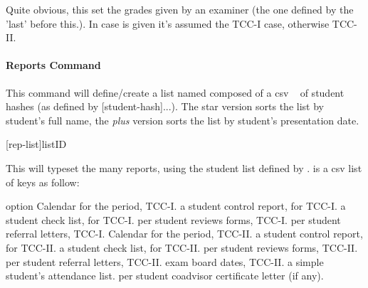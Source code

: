 \documentclass[article,nogeometry,english,tocdepth=3,secdepth=3]{ufrgscca} %
\begin{document}


\begin{codedescribe}[code,update=2023/11/18]{\examinergrades}
	\begin{codesyntax}%
	\end{codesyntax}
Quite obvious, this set the grades given by an examiner (the one defined by the 'last' \tsmacro{\examiner}{} before this.). In case  is given it's assumed the TCC-I case, otherwise TCC-II.
\end{codedescribe}


\paragraph{Reports Command}




\begin{codedescribe}[code,update=2023/11/29]{\setstudentlist}
	\begin{codesyntax}%
		\tsmacro{\setstudentlist}{listID,list}
		\tsmacro{\setstudentlist*}{listID,list}
	\end{codesyntax}
This command will define/create a list named  composed of a csv ~ of student hashes (as defined by \tsmacro{\student}[student-hash]{...}). The star version sorts the list by student's full name, the \emph{plus} version sorts the list by student's presentation date.
\end{codedescribe}

\begin{codedescribe}{\tcreports}
	\begin{codesyntax}%
		\tsmacro{\tcreports}[rep-list]{listID}
	\end{codesyntax}
	This will typeset the many reports, using the student list defined by .
     is a csv list of keys as follow:
\end{codedescribe}

\begin{describelist}{option}
	 { Calendar for the period, TCC-I.}
	 { a student control report, for TCC-I.}
	 { a student check list, for TCC-I.}
	 { per student reviews forms, TCC-I.}
	 { per student referral letters, TCC-I.}
	 { Calendar for the period, TCC-II.}
	 { a student control report, for TCC-II.}
	 { a student check list, for TCC-II.}
	 { per student reviews forms, TCC-II.}
	 { per student referral letters, TCC-II.}
	 { exam board dates, TCC-II.}
	 { a simple student's attendance list.}
	 { per student coadvisor certificate letter (if any).}
\end{describelist}
\end{document}
